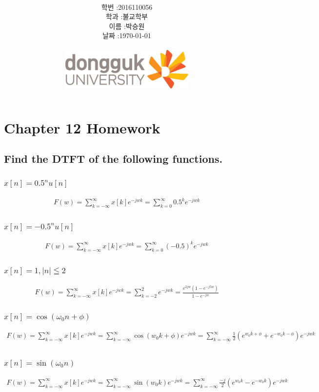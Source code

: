 \documentclass[12pt,a4paper]{article}
\title{
	\centering
	\pgfornament[width=12cm,color=teal]{84}\\
	\vspace{1cm}
	\fontsize{50}{50} \selectfont {정보통신 수학 및 실습\\Homework}\\
		\pgfornament[width=12cm,color=teal]{88}\\
	\vfill}
\author{
	\LARGE
	\begin{tabular}{rl}
		\hline
		학번 : & 2016110056\\ 
		학과 : & 불교학부 \\
		이름 : & 박승원\\
		날짜 : & \today\\
		\hline
	\end{tabular}\vspace{2cm}
	\\
\includegraphics[width=0.5\textwidth]{logo.jpg}
	}
\date{}
\begin{document}
\maketitle
{}
\noindent
\lstset{language=matlab, columns=flexible, tabsize=4, frame=shadowbox, showstringspaces=false, breaklines=true, upquote=true, basicstyle=\normalsize}

\renewcommand{\thesubsubsection}{\alph{subsubsection})}
\renewcommand{\thesubsection}{\arabic{subsection}.}
\newpage

\section*{Chapter 12 Homework}
\subsection{Find the DTFT of the following functions. } 
\subsubsection{$x[n] = 0.5^n u[n]$}
\begin{gather*}
F(w)=\sum_{k=-\infty}^{\infty}x[k]e^{-jwk}
=\sum_{k=0}^{\infty}0.5^ke^{-jwk}
\end{gather*}
\subsubsection{$x[n] = -0.5^n u[n]$}
\begin{gather*}
F(w)=\sum_{k=-\infty}^{\infty}x[k]e^{-jwk}
=\sum_{k=0}^{\infty}(-0.5)^ke^{-jwk}
\end{gather*}

\subsubsection{$x[n] = 1, |n|\leqq 2$}
\begin{gather*}
F(w)=\sum_{k=-\infty}^{\infty}x[k]e^{-jwk}
=\sum_{k=-2}^{2}e^{-jwk}
=\frac{e^{2jw}(1-e^{-j5w})}{1-e^{-jw}}
\end{gather*}

\subsubsection{$x[n]=\cos(\omega_0 n+\phi)$}
\begin{gather*}
F(w)=\sum_{k=-\infty}^{\infty}x[k]e^{-jwk}
=\sum_{k=-\infty}^{\infty}\cos(w_0k + \phi)e^{-jwk}
=\sum_{k=-\infty}^{\infty}\frac{1}{2}(e^{w_0k + \phi} + e^{-w_0k-\phi}) e^{-jwk}\\
\end{gather*}

\subsubsection{$x[n] = \sin(\omega_0 n)$}
\begin{gather*}
F(w)=\sum_{k=-\infty}^{\infty}x[k]e^{-jwk}
=\sum_{k=-\infty}^{\infty}\sin(w_0k)e^{-jwk}
=\sum_{k=-\infty}^{\infty}\frac{-j}{2}(e^{w_0k} - e^{-w_0k}) e^{-jwk}\\
\end{gather*}
\end{document}
